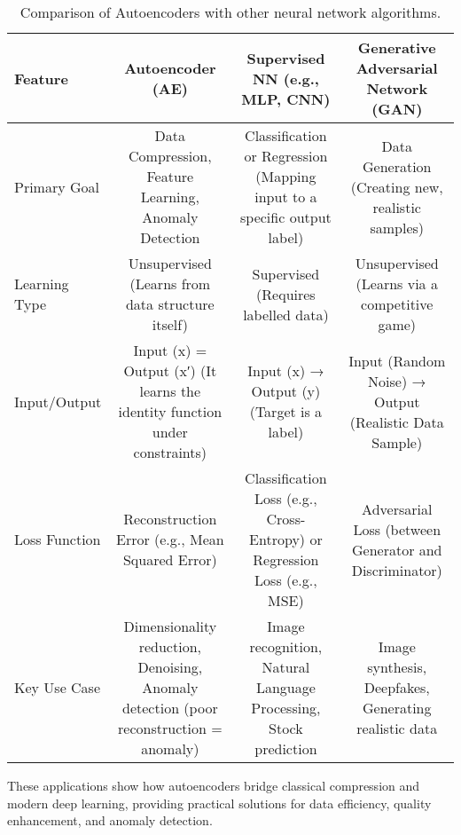\begin{table}[htbp]
\centering
\begin{tabular}{lccc}
\toprule
Feature & Autoencoder (AE) & Supervised NN (e.g., MLP, CNN) & Generative Adversarial Network (GAN) \\
\midrule
Primary Goal & Data Compression, Feature Learning, Anomaly Detection & Classification or Regression (Mapping input to a specific output label) & Data Generation (Creating new, realistic samples) \\
Learning Type & Unsupervised (Learns from data structure itself) & Supervised (Requires labelled data) & Unsupervised (Learns via a competitive game) \\
Input/Output & Input (x) = Output (x′) (It learns the identity function under constraints) & Input (x) → Output (y) (Target is a label) & Input (Random Noise) → Output (Realistic Data Sample) \\
Loss Function & Reconstruction Error (e.g., Mean Squared Error) & Classification Loss (e.g., Cross-Entropy) or Regression Loss (e.g., MSE) & Adversarial Loss (between Generator and Discriminator) \\
Key Use Case & Dimensionality reduction, Denoising, Anomaly detection (poor reconstruction = anomaly) & Image recognition, Natural Language Processing, Stock prediction & Image synthesis, Deepfakes, Generating realistic data \\
\bottomrule
\end{tabular}
\caption{Comparison of Autoencoders with other neural network algorithms.}
\label{tab:autoencoder-comparison}
\end{table}

These applications show how autoencoders bridge classical compression and modern deep learning, providing practical solutions for data efficiency, quality enhancement, and anomaly detection.

